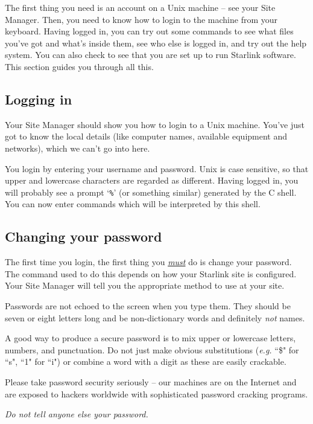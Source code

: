\documentclass[twoside,11pt]{article}
\begin{document}
The first thing you need is an account on a Unix machine -- see your Site
Manager.
Then, you need to know how to login to the machine from your keyboard.
Having logged in, you can try out some commands to see what files you've got
and what's inside them, see who else is logged in, and try out the help system.
You can also check to see that you are set up to run Starlink software.
This section guides you through all this.

\subsection{Logging in}

Your Site Manager should show you how to login to a Unix machine.
You've just got to know the local details (like computer names, available
equipment and networks), which we can't go into here.

You login by entering your username and password. 
Unix is case sensitive, so that upper and lowercase characters are
regarded as different.
Having logged in, you will probably see a prompt `{\tt \%}' (or something
similar) generated by the
C shell.
You can now enter commands which will 
be interpreted by this shell.

\subsection{Changing your password}

The first time you login, the first thing you \underline{\em must\/} do 
is change your password.
The command used to do this depends on how your Starlink site
is configured.
Your Site Manager will tell you the appropriate method to use at your site.

Passwords are not echoed to the screen when you type them.
They should be seven or eight letters long and
be non-dictionary words and definitely {\em not}\/ names.

A good way to produce a secure password is to mix upper or lowercase
letters, numbers, and punctuation. Do not just make obvious substitutions
({\em e.g.}\/ ``\$" for ``s", ``1" for ``i") or combine a word with a digit
as these are easily crackable.

Please take password security seriously -- our machines are on the 
Internet and are exposed to hackers worldwide with sophisticated 
password cracking programs.

{\em Do not tell anyone else your password.}
\end{document}
